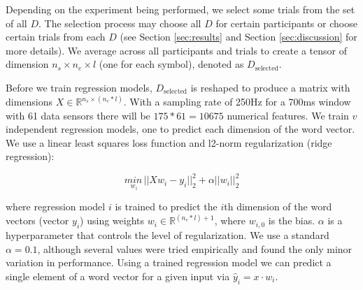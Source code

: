 Depending on the experiment being performed, we select some trials from the set of all $D$. The selection process may choose all $D$ for certain participants or choose certain trials from each $D$ (see Section \ref{sec:results} and Section \ref{sec:discussion} for more details). We average across all participants and trials to create a tensor of dimension $n_s \times n_e \times l$ (one for each symbol), denoted as $D_\text{selected}$.  
  
  

 Before we train regression models, $D_{\text{selected}}$ is reshaped to produce a matrix with dimensions $X \in \mathbb{R}^{n_s \times (n_e * l)}$.  With a sampling rate of 250Hz for a 700ms window with 61 data sensors there will be $175*61 = 10675$ numerical features. We train $v$ independent regression models, one to predict each dimension of the word vector.  We use a linear least squares loss function and l2-norm regularization (ridge regression):

  \begin{equation}
    \underset{w_i}{min\,} {|| X w_i - y_i||_2^2 + \alpha ||w_i||_2^2}
    \label{eq:ridge}
  \end{equation}
  
  \noindent where regression model $i$ is trained to predict the $i$th dimension of the word vectors (vector $y_i$) using weights $w_i \in \mathbb{R}^{(n_e * l) + 1}$, where $w_{i,0}$ is the bias. $\alpha$ is a hyperparameter that controls the level of regularization. We use a standard $\alpha = 0.1$, although several values were tried empirically and found the only minor variation in performance. Using a trained regression model we can predict a single element of a word vector for a given input via $\hat{y}_i = x \cdot w_i$.
  
